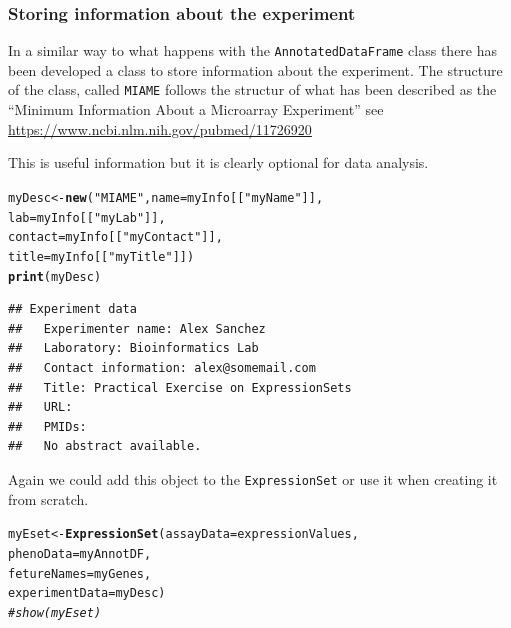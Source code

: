 \documentclass[a4paper]{article}\usepackage[]{graphicx}\usepackage[]{color}
\makeatletter
\newcommand{\hlstr}[1]{\textcolor[rgb]{0.192,0.494,0.8}{#1}}%
\newcommand{\hlcom}[1]{\textcolor[rgb]{0.678,0.584,0.686}{\textit{#1}}}%
\newcommand{\hlstd}[1]{\textcolor[rgb]{0.345,0.345,0.345}{#1}}%
\newcommand{\hlkwb}[1]{\textcolor[rgb]{0.69,0.353,0.396}{#1}}%
\newcommand{\hlkwc}[1]{\textcolor[rgb]{0.333,0.667,0.333}{#1}}%
\newcommand{\hlkwd}[1]{\textcolor[rgb]{0.737,0.353,0.396}{\textbf{#1}}}%
\newenvironment{kframe}{%
 \def\at@end@of@kframe{}%
 \ifinner\ifhmode%
  \def\at@end@of@kframe{\end{minipage}}%
  \begin{minipage}{\columnwidth}%
 \fi\fi%
 \def\FrameCommand##1{\hskip\@totalleftmargin \hskip-\fboxsep
 \colorbox{shadecolor}{##1}\hskip-\fboxsep
     \hskip-\linewidth \hskip-\@totalleftmargin \hskip\columnwidth}%
 \MakeFramed {\advance\hsize-\width
   \@totalleftmargin\z@ \linewidth\hsize
   \@setminipage}}%
 {\par\unskip\endMakeFramed%
 \at@end@of@kframe}
\newenvironment{knitrout}{}{} %
\makeatother
\begin{document}
\subsubsection{Storing information about the experiment}

In a similar way to what happens with the \texttt{AnnotatedDataFrame} class there has been developed a class to store information about the experiment. The structure of the class, called \texttt{MIAME} follows the structur of what has been described as the ``Minimum Information About a Microarray Experiment'' see \url{https://www.ncbi.nlm.nih.gov/pubmed/11726920}

This is useful information but it is clearly optional for data analysis.

\begin{knitrout}
\color{fgcolor}\begin{kframe}
\begin{alltt}
\hlstd{myDesc} \hlkwb{<-} \hlkwd{new}\hlstd{(}\hlstr{"MIAME"}\hlstd{,} \hlkwc{name}\hlstd{= myInfo[[}\hlstr{"myName"}\hlstd{]],}
            \hlkwc{lab}\hlstd{= myInfo[[}\hlstr{"myLab"}\hlstd{]],}
            \hlkwc{contact}\hlstd{= myInfo[[}\hlstr{"myContact"}\hlstd{]] ,}
            \hlkwc{title}\hlstd{=myInfo[[}\hlstr{"myTitle"}\hlstd{]])}
\hlkwd{print}\hlstd{(myDesc)}
\end{alltt}
\begin{verbatim}
## Experiment data
##   Experimenter name: Alex Sanchez 
##   Laboratory: Bioinformatics Lab 
##   Contact information: alex@somemail.com 
##   Title: Practical Exercise on ExpressionSets 
##   URL:  
##   PMIDs:  
##   No abstract available.
\end{verbatim}
\end{kframe}
\end{knitrout}

Again we could add this object to the \texttt{ExpressionSet} or use it when creating it from scratch.

\begin{knitrout}
\color{fgcolor}\begin{kframe}
\begin{alltt}
\hlstd{myEset} \hlkwb{<-} \hlkwd{ExpressionSet}\hlstd{(}\hlkwc{assayData}\hlstd{=expressionValues,}
                        \hlkwc{phenoData}\hlstd{=myAnnotDF,}
                        \hlkwc{fetureNames} \hlstd{=myGenes,}
                        \hlkwc{experimentData} \hlstd{= myDesc)}
\hlcom{# show(myEset)}
\end{alltt}
\end{kframe}
\end{knitrout}
\end{document}
